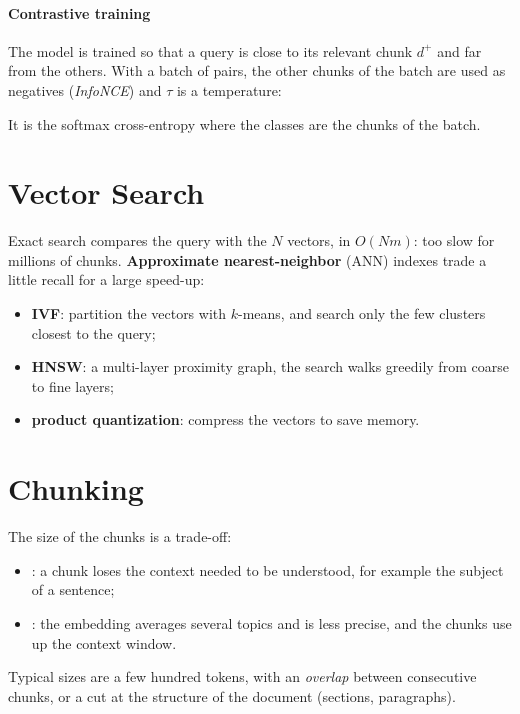 \paragraph{Contrastive training}
The model is trained so that a query is close to its relevant chunk $d^{+}$ and far from the
others. With a batch of pairs, the other chunks of the batch are used as negatives
(\emph{InfoNCE}) and $\tau$ is a temperature:
\begin{center}
\end{center}
It is the softmax cross-entropy where the classes are the chunks of the batch.

\section{Vector Search}
Exact search compares the query with the $N$ vectors, in $O(Nm)$: too slow for millions of
chunks. \textbf{Approximate nearest-neighbor} (ANN) indexes trade a little recall for a large
speed-up:
\begin{itemize}
    \item \textbf{IVF}: partition the vectors with $k$-means, and search only the few
        clusters closest to the query;
    \item \textbf{HNSW}: a multi-layer proximity graph, the search walks greedily from
        coarse to fine layers;
    \item \textbf{product quantization}: compress the vectors to save memory.
\end{itemize}

\section{Chunking}
The size of the chunks is a trade-off:
\begin{itemize}
    \item {}: a chunk loses the context needed to be understood, for example the
        subject of a sentence;
    \item {}: the embedding averages several topics and is less precise, and the
        chunks use up the context window.
\end{itemize}
Typical sizes are a few hundred tokens, with an \emph{overlap} between consecutive chunks, or
a cut at the structure of the document (sections, paragraphs).

